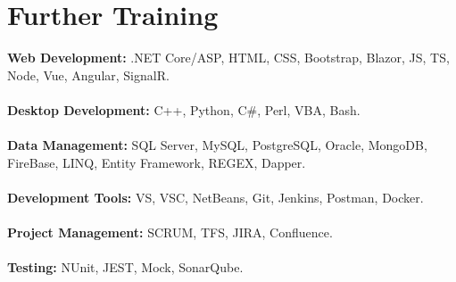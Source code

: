 \documentclass[letterpaper]{twentysecondcv} %
\begin{document}
\section{Further Training}
{
   {\textbf{Web Development:}} .NET Core/ASP, HTML, CSS, Bootstrap, Blazor, JS, TS, Node, Vue, Angular, SignalR.\\\\
   {\textbf{Desktop Development:}} C++, Python, C\#, Perl, VBA, Bash.\\\\
   {\textbf{Data Management:}} SQL Server, MySQL, PostgreSQL, Oracle, MongoDB, FireBase, LINQ, Entity Framework, REGEX, Dapper.\\\\
   {\textbf{Development Tools:}} VS, VSC, NetBeans, Git, Jenkins, Postman, Docker.\\\\
   {\textbf{Project Management:}} SCRUM, TFS, JIRA, Confluence.\\\\
   {\textbf{Testing:}} NUnit, JEST, Mock, SonarQube.
}
\end{document}
